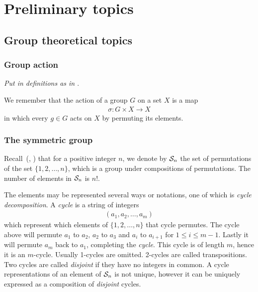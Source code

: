 \clearpage{\thispagestyle{empty}}
\section{Preliminary topics}

\subsection{Group theoretical topics}

\subsubsection{Group action}

\textit{Put in definitions as in \cite{DummitFoote}}.

We remember that the action of a group $G$ on a set $X$ is a map
\begin{align*}
	\sigma : G \times X \rightarrow X
\end{align*}
in which every $g \in G$ acts on $X$ by permuting its elements.

%

\subsubsection{The symmetric group}

Recall~(\cite[1.3.]{DummitFoote}, \cite[1.1]{Sagan}) that for a positive integer $n$, we denote by $\mathcal{S}_n$ the set of permutations of the set $\{1, 2, \dots, n\}$, which is a group under compositions of permutations. The number of elements in $\mathcal{S}_n$ is $n!$.

The elements may be represented several ways or notations, one of which is \textit{cycle decomposition}. A \textit{cycle} is a string of integers \begin{align*}
	(a_1, a_2, \dots, a_m)
\end{align*} which represent which elements of $\{1,2, \dots, n\}$ that cycle permutes. The cycle above will permute $a_1$ to $a_2$, $a_2$ to $a_3$ and $a_{i}$ to $a_{i+1}$ for $1 \leq i \leq m-1$. Lastly it will permute $a_m$ back to $a_1$, completing the \textit{cycle}. This cycle is of length $m$, hence it is an $m$-cycle. Usually 1-cycles are omitted. 2-cycles are called transpositions. Two cycles are called \textit{disjoint} if they have no integers in common. A cycle representations of an element of $\mathcal{S}_n$ is not unique, however it can be uniquely expressed as a composition of \textit{disjoint} cycles.

